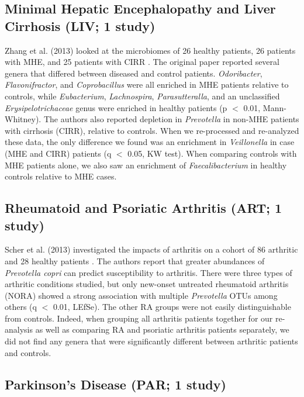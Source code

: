 \documentclass{article}
\begin{document}
{\subsection*{Minimal Hepatic Encephalopathy and Liver Cirrhosis (LIV; 1 study)}

Zhang et al. (2013) looked at the microbiomes of 26 healthy patients, 26 patients with MHE, and 25 patients with CIRR \cite{mhe-zhang}. 
The original paper reported several genera that differed between diseased and control patients. \textit{Odoribacter}, \textit{Flavonifractor}, and \textit{Coprobacillus} were all enriched in MHE patients relative to controls, while \textit{Eubacterium}, \textit{Lachnospira}, \textit{Parasutteralla}, and an unclassified \textit{Erysipelotrichaceae} genus were enriched in healthy patients (p $<$ 0.01, Mann-Whitney). 
The authors also reported depletion in \textit{Prevotella} in non-MHE patients with cirrhosis (CIRR), relative to controls.
When we re-processed and re-analyzed these data, the only difference we found was an enrichment in \textit{Veillonella} in case (MHE and CIRR) patients (q $<$ 0.05, KW test).
When comparing controls with MHE patients alone, we also saw an enrichment of \textit{Faecalibacterium} in healthy controls relative to MHE cases.

\subsection*{Rheumatoid and Psoriatic Arthritis (ART; 1 study)}

Scher et al. (2013) investigated the impacts of arthritis on a cohort of 86 arthritic and 28 healthy patients \cite{ra-littman}. 
The authors report that greater abundances of \textit{Prevotella copri} can predict susceptibility to arthritis. 
There were three types of arthritic conditions studied, but only new-onset untreated rheumatoid arthritis (NORA) showed a strong association with multiple \textit{Prevotella} OTUs among others (q $<$ 0.01, LEfSe). 
The other RA groups were not easily distinguishable from controls. 
Indeed, when grouping all arthritis patients together for our re-analysis as well as comparing RA and psoriatic arthritis patients separately, we did not find any genera that were significantly different between arthritic patients and controls.

\subsection*{Parkinson's Disease (PAR; 1 study)}

}
\end{document}
